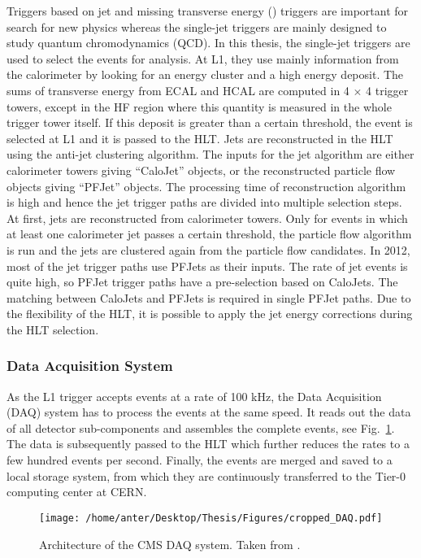 Triggers based on jet and missing transverse energy (\ETmiss) triggers are important for search for new physics whereas the single-jet triggers are mainly designed to study quantum chromodynamics (QCD). In this thesis, the single-jet triggers are used to select the events for analysis. At L1, they use mainly information from the calorimeter by looking for an energy cluster and a high energy deposit. The sums of transverse energy from ECAL and HCAL are computed in 4 $\times$ 4 trigger towers, except in the HF region where this quantity is measured in the whole trigger tower itself. If this deposit is greater than a certain threshold, the event is selected at L1 and it is passed to the HLT. Jets are reconstructed in the HLT using the anti-\kt jet clustering algorithm. The inputs for the jet algorithm are either calorimeter towers giving ``CaloJet'' objects, or the reconstructed particle flow objects giving ``PFJet'' objects. The processing time of reconstruction algorithm is high and hence the jet trigger paths are divided into multiple selection steps. At first, jets are reconstructed from calorimeter towers. Only for events in which at least one calorimeter jet passes a certain \pt threshold, the particle flow algorithm is run and the jets are clustered again from the particle flow candidates. In 2012, most of the jet trigger paths use PFJets as their inputs. The rate of jet events is quite high, so PFJet trigger paths have a pre-selection based on CaloJets. The matching between CaloJets and PFJets is required in single PFJet paths. Due to the flexibility of the HLT, it is possible to apply the jet energy corrections during the HLT selection.

\subsubsection{Data Acquisition System}
As the L1 trigger accepts events at a rate of 100 kHz, the Data Acquisition (DAQ) system has to process the events at the same speed. It reads out the data of all detector sub-components and assembles the complete events, see Fig.~\ref{fig:DAQ}. The data is subsequently passed to the HLT which further reduces the rates to a few hundred events per second. Finally, the events are merged and saved to a local storage system, from which they are continuously transferred to the Tier-0 computing center at CERN.

\begin{figure}[!h]
\begin{center}
\vspace*{3mm} 
\hspace*{-5mm}
\texttt{[image: /home/anter/Desktop/Thesis/Figures/cropped\_DAQ.pdf]}\\
\vspace*{4mm}
\caption{Architecture of the CMS DAQ system. Taken from \cite{Chatrchyan:2008aa}.}
\label{fig:DAQ}
\end{center}
\end{figure}

